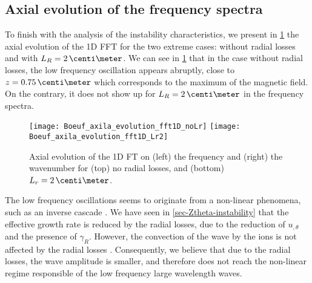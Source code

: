   \subsection{Axial evolution of the frequency spectra} \label{subsec-axialFFT}
  
  To finish with the analysis of the instability characteristics, we present in \cref{fig-axial_fft1D} the axial evolution of the \ac{1D} \ac{FFT} for the two extreme cases\string: without radial losses and with $L_R=2\,\centi\meter$.
  We can see in \cref{fig-axial_fft1D} that in the case without radial losses, the low frequency oscillation appears abruptly, close to $z=0.75\,\centi\meter$ which corresponds to the maximum of the magnetic field.
  On the contrary, it does not show up for $L_R=2\,\centi\meter$ in the frequency spectra.
  
 \begin{figure}[!hbt]
   \centering
   \texttt{[image: Boeuf\_axila\_evolution\_fft1D\_noLr]}
   \texttt{[image: Boeuf\_axila\_evolution\_fft1D\_Lr2]}
   \caption{Axial evolution of the \acs{1D} \acs{FT} on (left) the frequency and (right) the wavenumber for (top) no radial losses, and (bottom) $L_r=2\,\centi\meter$. }
   \label{fig-axial_fft1D}
 \end{figure}
  
  The low frequency oscillations seems to originate from a non-linear phenomena, such as an inverse cascade \citep{taccogna2019}.
  We have seen in \cref{sec-Ztheta-instability} that the effective growth rate is reduced by the radial losses, due to the reduction of $u_{, \theta}$ and the presence of $\gamma_R$.
  However, the convection of the wave by the ions is not affected by the radial losses \citep{martorelli2019}.
  Consequently, we believe that due to the radial losses, the wave amplitude is smaller, and therefore does not reach the non-linear regime responsible of the low frequency large wavelength waves.

